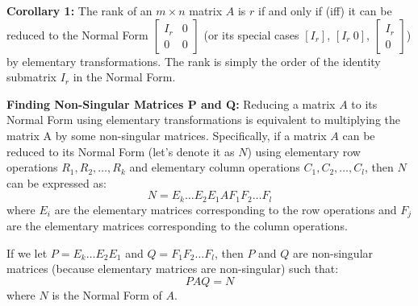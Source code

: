 \documentclass{article}
\begin{document}
\textbf{Corollary 1:}
The rank of an $m \times n$ matrix $A$ is $r$ if and only if (iff) it can be reduced to the Normal Form $\begin{bmatrix} I_r & 0 \\ 0 & 0 \end{bmatrix}$ (or its special cases $[I_r]$, $[I_r \ 0]$, $\begin{bmatrix} I_r \\ 0 \end{bmatrix}$) by elementary transformations. The rank is simply the order of the identity submatrix $I_r$ in the Normal Form.

\textbf{Finding Non-Singular Matrices P and Q:}
Reducing a matrix $A$ to its Normal Form using elementary transformations is equivalent to multiplying the matrix A by some non-singular matrices. Specifically, if a matrix $A$ can be reduced to its Normal Form (let's denote it as $N$) using elementary row operations $R_1, R_2, \dots, R_k$ and elementary column operations $C_1, C_2, \dots, C_l$, then $N$ can be expressed as:
\[ N = E_k \dots E_2 E_1 A F_1 F_2 \dots F_l \]
where $E_i$ are the elementary matrices corresponding to the row operations and $F_j$ are the elementary matrices corresponding to the column operations.

If we let $P = E_k \dots E_2 E_1$ and $Q = F_1 F_2 \dots F_l$, then $P$ and $Q$ are non-singular matrices (because elementary matrices are non-singular) such that:
\[ PAQ = N \]
where $N$ is the Normal Form of $A$.
\end{document}
